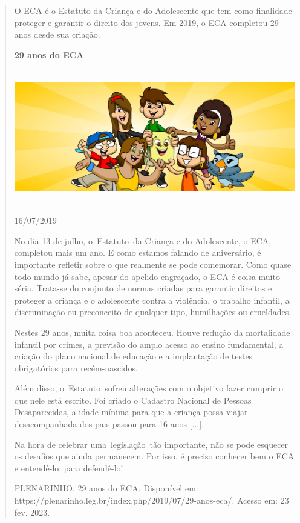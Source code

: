\begin{quote}
O ECA é o Estatuto da Criança e do Adolescente que tem como finalidade
proteger e garantir o direito dos jovens. Em 2019, o ECA completou 29
anos desde sua criação.

\textbf{29 anos do ECA}

\includegraphics[width=5.90556in,height=2.30417in]{media/image26.jpeg}

16/07/2019~

No dia 13 de julho, o~Estatuto~da Criança e do Adolescente, o ECA,
completou mais um ano. E como estamos falando de aniversário, é
importante refletir sobre o que realmente se pode comemorar. Como quase
todo mundo já sabe, apesar do apelido engraçado, o ECA é coisa muito
séria. Trata-se do conjunto de normas criadas para garantir direitos e
proteger a criança e o adolescente contra a violência, o trabalho
infantil, a discriminação ou preconceito de qualquer tipo, humilhações
ou crueldades.

Nestes 29 anos, muita coisa boa aconteceu. Houve redução da mortalidade
infantil por crimes, a previsão do amplo acesso ao ensino fundamental, a
criação do plano nacional de educação e a implantação de testes
obrigatórios para recém-nascidos.

\protect\hypertarget{_Hlk128033654}{}{}Além disso, o~Estatuto~sofreu
alterações com o objetivo fazer cumprir o que nele está escrito. Foi
criado o Cadastro Nacional de Pessoas Desaparecidas, a idade mínima para
que a criança possa viajar desacompanhada dos pais passou para 16 anos
{[}...{]}.

Na hora de celebrar uma~legislação~tão importante, não se pode esquecer
os desafios que ainda permanecem. Por isso, é preciso conhecer bem o ECA
e entendê-lo, para defendê-lo!

PLENARINHO. 29 anos do ECA. Disponível em:
https://plenarinho.leg.br/index.php/2019/07/29-anos-eca/. Acesso em: 23
fev. 2023.


\end{quote}

